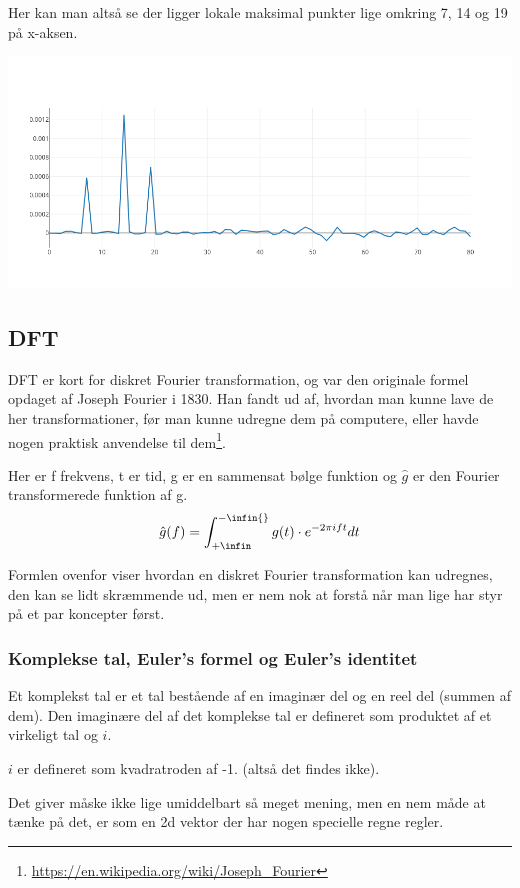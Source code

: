 \documentclass[11pt,a4paper]{article}
\begin{document}
Her kan man altså se der ligger lokale maksimal punkter lige omkring 7, 14 og 19 på x-aksen.
\begin{center}
\includegraphics[width=.9\linewidth]{./plot2.png}
\end{center}

\bigskip

\subsection{DFT}
\label{sec:orged60637}
DFT er kort for diskret Fourier transformation, og var den originale formel opdaget af Joseph Fourier i 1830.
Han fandt ud af, hvordan man kunne lave de her transformationer, før man kunne udregne dem på computere,
eller havde nogen praktisk anvendelse til dem\footnote{\url{https://en.wikipedia.org/wiki/Joseph\_Fourier}}.

Her er f frekvens, t er tid, g er en sammensat bølge funktion og \(\hat{g}\) er den Fourier transformerede funktion af g.
$$
\hat{g}(f) = \int_{+\infin}^{-\infin{}} g(t) \cdot e ^{-2\pi ift}dt
$$

Formlen ovenfor viser hvordan en diskret Fourier transformation kan udregnes,
den kan se lidt skræmmende ud, men er nem nok at forstå når man lige har styr på et par koncepter først.

\bigskip

\subsubsection{Komplekse tal, Euler's formel og Euler's identitet}
\label{sec:org16c6b75}

Et komplekst tal er et tal bestående af en imaginær del og en reel del (summen af dem).
Den imaginære del af det komplekse tal er defineret som produktet af et
virkeligt tal og \(i\).

\(i\) er defineret som kvadratroden af -1. (altså det findes ikke).

Det giver måske ikke lige umiddelbart så meget mening, men en nem måde at tænke på det,
er som en 2d vektor der har nogen specielle regne regler.
\end{document}
